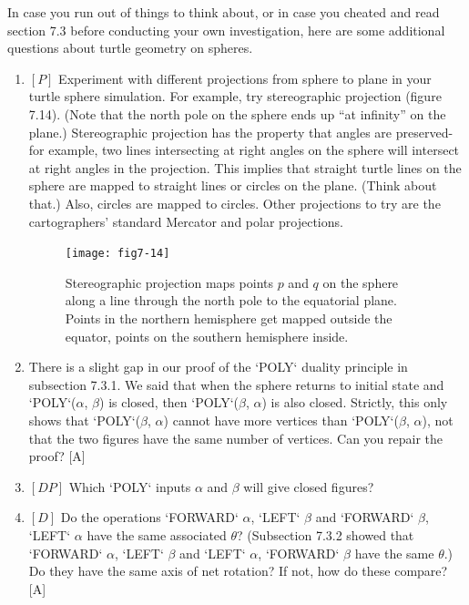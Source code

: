 \documentclass{book}
\begin{document}
In case you run out of things to think about, or in case you cheated and
read section 7.3 before conducting your own investigation, here are some
additional questions about turtle geometry on spheres.
\begin{enumerate}
\item $[P]$ Experiment with different projections from sphere to plane in
your turtle sphere simulation. For example, try stereographic projection
(figure 7.14). (Note that the north pole on the sphere ends up ``at
infinity'' on the plane.) Stereographic projection has the property that
angles are preserved-for example, two lines intersecting at right angles
on the sphere will intersect at right angles in the projection. This implies
that straight turtle lines on the sphere are mapped to straight lines or
circles on the plane. (Think about that.) Also, circles are mapped
to circles. Other projections to try are the cartographers' standard
Mercator and polar projections.

\begin{figure}
\begin{center}
\texttt{[image: fig7-14]}
\caption{Stereographic projection maps points $p$ and $q$ on the sphere along a line through the north pole to the equatorial plane. Points in the northern hemisphere get mapped outside the equator, points on the southern hemisphere inside.}
\end{center}
\end{figure}

\item There is a slight gap in our proof of the \textsc{`POLY`} duality principle in
subsection 7.3.1. We said that when the sphere returns to initial state
and \textsc{`POLY`}($\alpha$, $\beta$) is closed, then \textsc{`POLY`}($\beta$, $\alpha$) is also closed. Strictly, this
only shows that \textsc{`POLY`}($\beta$, $\alpha$) cannot have more vertices than \textsc{`POLY`}($\beta$, $\alpha$),
not that the two figures have the same number of vertices. Can you
repair the proof? [A]

\item $[DP]$ Which \textsc{`POLY`} inputs $\alpha$ and $\beta$ will give closed figures?

\item $[D]$ Do the operations \textsc{`FORWARD`} $\alpha$, \textsc{`LEFT`} $\beta$ and \textsc{`FORWARD`} $\beta$, \textsc{`LEFT`} $\alpha$ have the same associated $\theta$? (Subsection 7.3.2 showed that \textsc{`FORWARD`} $\alpha$,
\textsc{`LEFT`} $\beta$ and \textsc{`LEFT`} $\alpha$, \textsc{`FORWARD`} $\beta$ have the same $\theta$.) 
Do they have the same axis of net rotation? If not, how do these compare? [A]


\end{enumerate}
\end{document}
